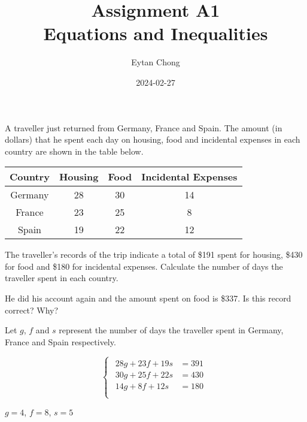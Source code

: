 \documentclass{jhwhw}
\title{Assignment A1\\Equations and Inequalities}
\author{Eytan Chong}
\date{2024-02-27}
\begin{document}
    \problem{}
        A traveller just returned from Germany, France and Spain. The amount (in dollars) that he spent each day on housing, food and incidental expenses in each country are shown in the table below.

        \begin{table}[h]
            \centering
            \begin{tabular}{|c|c|c|c|}
            \hline
            \textbf{Country} & \textbf{Housing} & \textbf{Food} & \textbf{Incidental Expenses}  \\\hline
            Germany & 28      & 30   & 14                   \\\hline
            France  & 23      & 25   & 8                    \\\hline
            Spain   & 19      & 22   & 12 \\\hline                  
            \end{tabular}
        \end{table}

        The traveller's records of the trip indicate a total of \$191 spent for housing, \$430 for food and \$180 for incidental expenses. Calculate the number of days the traveller spent in each country.

        He did his account again and the amount spent on food is \$337. Is this record correct? Why?

    \solution
        Let $g$, $f$ and $s$ represent the number of days the traveller spent in Germany, France and Spain respectively. 

        \begin{equation*}
            \begin{cases}
                \begin{aligned}
                    28g + 23f + 19s &= 391\\
                    30g + 25f + 22s &= 430\\
                    14g + 8f + 12s &= 180\\
                \end{aligned}
            \end{cases}
        \end{equation*}

        \begin{center}
            $g=4$, $f=8$, $s=5$
        \end{center}

\end{document}
